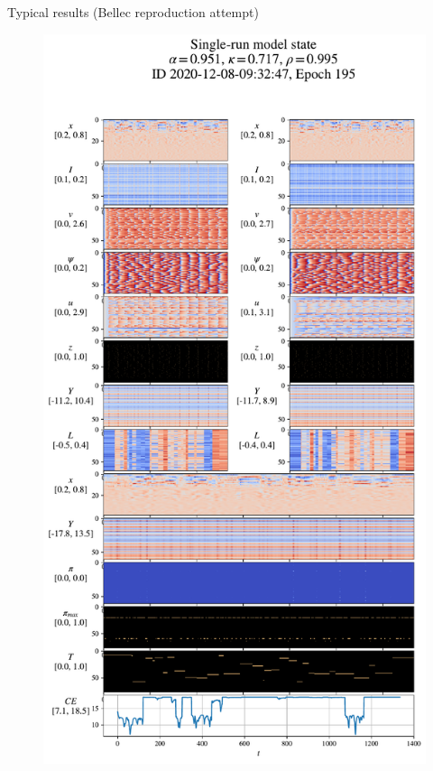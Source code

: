 \documentclass[t]{beamer}
\begin{document}
\begin{frame}{Typical results (Bellec reproduction attempt)}

	\begin{figure}[!ht]
		\includegraphics[clip, trim=0cm 0cm 0cm 4.2cm, width=0.33\linewidth]{state_195.pdf}  %
	\end{figure}

\end{frame}
\end{document}

